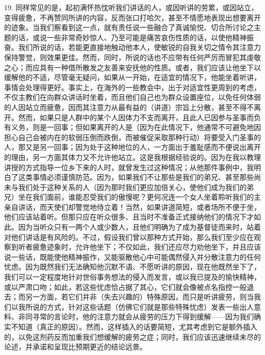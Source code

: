 19. 同样常见的是，起初满怀热忱听我们讲话的人，或因听讲的劳累，或因站立，变得疲惫，不再赞同所讲的内容，反而张口打哈欠，甚至不情愿地表现出想要离开的迹象。当我们察看到这一点，就有责任说一些融合了真诚愉悦、切合所讨论之主题的话，或说一些非常奇妙惊人、乃至可能是痛苦哀伤性质的话，以使他精神振奋。我们所说的话，若能更直接地触动他本人，使敏锐的自我关切之情令其注意力保持警觉，则效果更佳。然而，同时，所说的话也不应带有任何严厉而冒犯其虔敬之心；而应具有一种借所散发之友善来安抚他的性质。或者，我们应该让他坐下以缓解他的不适，尽管毫无疑问，如果从一开始，在适宜的情况下，他能坐着听讲，事情会处理得更好。事实上，在海外的一些教会中，出于对适宜性更周到的考虑，不仅主教们在向群众讲话时坐着，而且他们自己也为群众设置座位，以免任何体弱的人因站立而疲惫，因而其注意力从最有益的（讲道）宗旨上分散，甚至不得不离开。然而，如果只是人群中的某个人因体力不支而离开，且此人已因参与圣事而负有义务，则是一回事；但如果离开的人是（因为在此情况下，他通常不可避免地因担心自己会被内在的软弱压倒而跌倒，而被催促采取那种行动）将要受入门圣事的人，那又是另一回事；因为处于这种地位的人，一方面出于羞耻感而不便说出离开的理由，另一方面其体力又不允许他站立。这是我根据经验说的。因为在我以教理讲授的方式指导一位乡下来的人时，就曾发生过这种情况；从他那件事例中，我明白了这类事情必须谨慎防范。因为，如果我们不让那些是我们的弟兄、甚至那些尚未与我们处于这种关系的人（因为那时我们更应加倍关心，使他们成为我们的弟兄）坐在我们面前，谁能忍受我们的傲慢呢？更何况连一个女人坐着聆听我们的主亲自讲话，而天使们却警觉地侍立着！当然，如果讲道简短，或者场所不便于坐，他们应该站着听。但那只应在听众很多、且当时不准备正式接纳他们的情况下才如此。因为当听众只有一两个人或少数人，且他们明确为了成为基督徒而来时，站着对他们讲话是有风险的。不过，假设我们曾以那种方式开始，那么我们至少应在观察到听者疲惫迹象时，允许他坐下；不仅如此，我们还应尽力劝他坐下，并且应该说一些话，既能使他精神振作，又能驱散他心中可能偶然侵入并分散注意力的任何忧虑。因为既然我们无法确知他沉默不语、不愿听讲的原因，现在他既然坐下了，我们可以一定程度地针对世俗事务想法的侵入而发言，或以我已提及的愉快精神，或以严肃口吻；如此，若这些忧虑恰占据了其心，它们就会像被点名指控一般退去；而另一方面，若它们并非（失去兴趣的）特殊原因，而只是听讲疲劳，则当我们以我所说的方式，针对这些话题（仿佛它们就是那些特殊忧虑）发表一些出人意料、非同寻常的言论时，他的注意力就会从疲劳的压力下得到缓解——因为我们确实不知道（真正的原因）。然而，这样插入的话要简短，尤其考虑到它是额外插入的，以免这剂药反而加重我们想缓解的疲劳之症；同时，我们应该迅速继续未尽的论述，并承诺和呈现比预期更近的结论远景。\par


